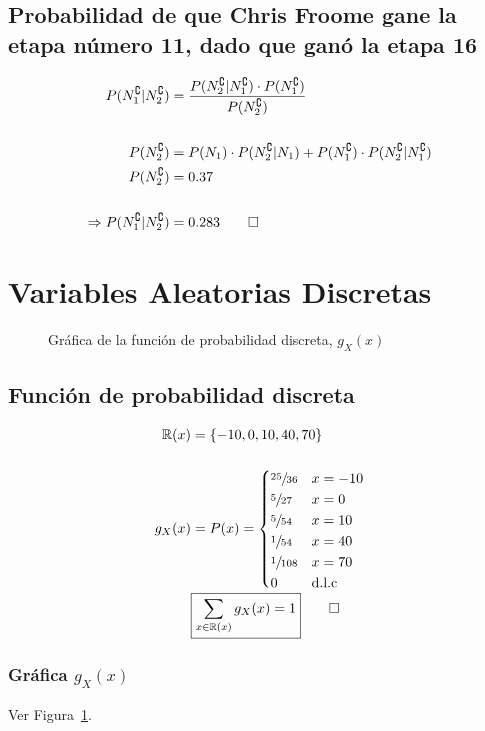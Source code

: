 \documentclass[paper=letterpaper]{article}
\begin{document}
\subsection{Probabilidad de que Chris Froome gane la etapa número 11, dado que ganó la etapa 16}
\begin{alignat*}{2}
P(N_1^{\complement} \vert N_2^{\complement}) &= \frac{P(N_2^{\complement} \vert N_1^{\complement})\cdot P(N_1^{\complement})}{P(N_2^{\complement})} \\ 
\\
P(N_2^{\complement}) &= P(N_1)\cdot P(N_2^{\complement} \vert N_1) + P(N_1^{\complement}) \cdot P(N_2^{\complement} \vert N_1^{\complement}) \\
P(N_2^{\complement}) &= 0.37 \\
\\
\Rightarrow P(N_1^{\complement} \vert N_2^{\complement}) &= 0.283 \qed
\end{alignat*}

\section{Variables Aleatorias Discretas}
\begin{figure}[!htbp]
\centering
{}
\caption{Gráfica de la función de probabilidad discreta, $g_X(x)$}
\label{Fig:F4}
\end{figure}
\subsection{Función de probabilidad discreta}
\begin{alignat*}{2}
\mathbb{R}(x) &= \{-10, 0, 10, 40, 70\} \\\\
 g_{X}(x) &= P(x) =
   \begin{dcases}
     \sfrac{25}{36} & x = -10 \\
     \sfrac{5}{27} & x = 0 \\
     \sfrac{5}{54} & x = 10 \\
     \sfrac{1}{54} & x = 40 \\
     \sfrac{1}{108} & x = 70 \\
     0 & \text{d.l.c}
   \end{dcases} \\
   &\boxed{\sum_{x \in \mathbb{R}(x)} g_X(x) = 1} \qed
\end{alignat*}

\subsubsection{Gráfica $g_X(x)$}
Ver Figura~\ref{Fig:F4}.
\end{document}
